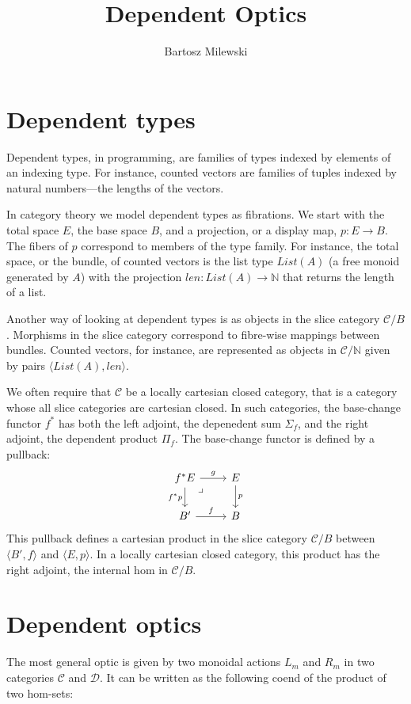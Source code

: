 \documentclass[11pt]{amsart}
\author{Bartosz Milewski}
\title{Dependent Optics}
\begin{document}
\maketitle{}

\section{Dependent types}

Dependent types, in programming, are families of types indexed by elements of an indexing type. For instance, counted vectors are families of tuples indexed by natural numbers---the lengths of the vectors.

In category theory we model dependent types as fibrations. We start with the total space $E$, the base space $B$, and a projection, or a display map, $p \colon E \to B$. The fibers of $p$ correspond to members of the type family. For instance, the total space, or the bundle, of counted vectors is the list type $\mathit{List} (A)$ (a free monoid generated by $A$) with the projection $\mathit{len} \colon \mathit{List} (A) \to \mathbb{N}$ that returns the length of a list.

Another way of looking at dependent types is as objects in the slice category $\mathcal{C}/B$. Morphisms in the slice category correspond to fibre-wise mappings between bundles. Counted vectors, for instance, are represented as objects in $\mathcal{C}/\mathbb{N}$ given by pairs $\langle \mathit{List} (A), \mathit{len} \rangle$.

We often require that $\mathcal{C}$ be a locally cartesian closed category, that is a category whose all slice categories are cartesian closed. In such categories, the base-change functor $f^*$ has both the left adjoint, the depenedent sum $\Sigma_f$, and the right adjoint, the dependent product $\Pi_f$. The base-change functor is defined by a pullback:
\[
 \begin{tikzcd}
f^* E
\arrow[dr, phantom,  , very near start, "\lrcorner"]
 \arrow[d, "f^*p"']
 \arrow[r, "g"]
 & E
 \arrow[d, "p"]
 \\
 B'
 \arrow[r, "f"]
 &B
  \end{tikzcd}
\]
This pullback defines a cartesian product in the slice category $\mathcal{C}/B$ between $\langle B', f \rangle$ and $\langle E, p \rangle$. In a locally cartesian closed category, this product has the right adjoint, the internal hom in $\mathcal{C}/B$.

\section{Dependent optics}
The most general optic is given by two monoidal actions $L_m$ and $R_m$ in two categories  $\mathcal{C}$ and $ \mathcal{D}$. It can be written as the following coend of the product of two hom-sets:
\end{document}
